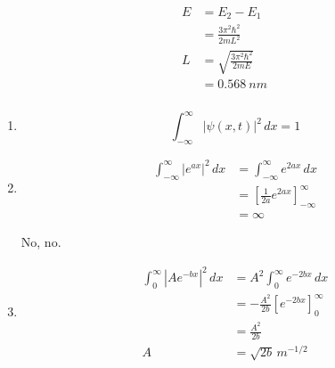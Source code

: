 \documentclass{article}
\begin{document}
\setcounter{subsubsection}{12}
\subsubsection{}

\begin{align*}
  E & = E_2 - E_1                            \\
    & = \frac{3 \pi^2 \hbar^2}{2 m L^2}      \\
  L & = \sqrt{\frac{3 \pi^2 \hbar^2}{2 m E}} \\
    & = \qty{0.568}{nm}
\end{align*}

\setcounter{subsubsection}{14}
\subsubsection{}

\begin{enumerate}
  \item \[\int_{-\infty}^\infty |\psi(x, t)|^2 \,dx = 1\]

  \item

        \begin{align*}
          \int_{-\infty}^\infty |e^{a x}|^2 \,dx & = \int_{-\infty}^\infty e^{2 a x} \,dx                    \\
                                                 & = \left[ \frac{1}{2 a} e^{2 a x} \right]_{-\infty}^\infty \\
                                                 & = \infty
        \end{align*}

        No, no.

  \item

        \begin{align*}
          \int_0^\infty |A e^{-b x}|^2 \,dx & = A^2 \int_0^\infty e^{-2 b x} \,dx      \\
                                            & = -\frac{A^2}{2 b} [e^{-2 b x}]_0^\infty \\
                                            & = \frac{A^2}{2 b}                        \\
          A                                 & = \sqrt{2 b} \,\unit{m^{-1 / 2}}
        \end{align*}
\end{enumerate}

\setcounter{subsubsection}{16}
\end{document}
